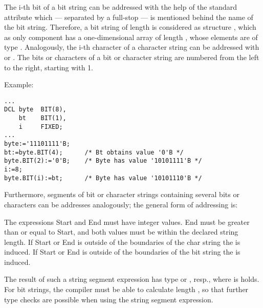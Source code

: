 \begin{grammarframe}
\end{grammarframe}

The i-th bit of a bit string can be addressed with the help of the
standard attribute 
 which --- separated by a full-stop --- is mentioned
behind the name of the bit string. Therefore, a bit string  of length
 is considered as structure , which as only component has a
one-dimensional array  of length ,
 whose elements are of type
. Analogously, the i-th character of a character string 
 can be
addressed with  or .
 The bits or characters of a
bit or character string are numbered from the left to the right,
 starting with 1.

Example:

\begin{lstlisting}
... 
DCL byte  BIT(8),
    bt    BIT(1), 
    i     FIXED;  
... 
byte:='11101111'B; 
bt:=byte.BIT(4);      /* Bt obtains value '0'B */
byte.BIT(2):='0'B;    /* Byte has value '10101111'B */
i:=8; 
byte.BIT(i):=bt;      /* Byte has value '10101110'B */
\end{lstlisting}

Furthermore, segments of bit or character strings containing several
bits or characters can be addresses analogously; the general form of
addressing is:

\begin{grammarframe}
\end{grammarframe}


The expressions Start and End must have integer values. End must be
greater than or equal to Start, and both values must be within the
declared string length.
If Start or End is outside of the boundaries of  the char string
the  is induced.
If Start or End is outside of the boundaries of  the bit string
the  is induced.

The result of such a string segment expression has type  or
, resp., where  is holds. For bit
strings, the compiler must be able to calculate length , so that
further type checks are possible when using the string segment
expression.

